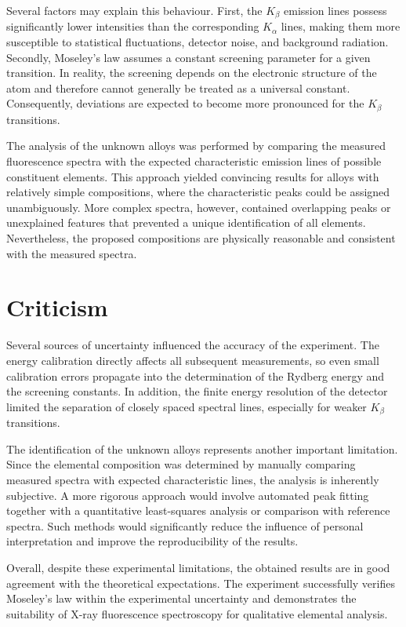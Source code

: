 Several factors may explain this behaviour. First, the $K_\beta$ emission lines possess significantly lower intensities than the corresponding $K_\alpha$ lines, making them more susceptible to statistical fluctuations, detector noise, and background radiation. Secondly, Moseley's law assumes a constant screening parameter for a given transition. In reality, the screening depends on the electronic structure of the atom and therefore cannot generally be treated as a universal constant. Consequently, deviations are expected to become more pronounced for the $K_\beta$ transitions.

The analysis of the unknown alloys was performed by comparing the measured fluorescence spectra with the expected characteristic emission lines of possible constituent elements. This approach yielded convincing results for alloys with relatively simple compositions, where the characteristic peaks could be assigned unambiguously. More complex spectra, however, contained overlapping peaks or unexplained features that prevented a unique identification of all elements. Nevertheless, the proposed compositions are physically reasonable and consistent with the measured spectra.

\section{Criticism}
\label{sec:Kritik}

Several sources of uncertainty influenced the accuracy of the experiment. The energy calibration directly affects all subsequent measurements, so even small calibration errors propagate into the determination of the Rydberg energy and the screening constants. In addition, the finite energy resolution of the detector limited the separation of closely spaced spectral lines, especially for weaker $K_\beta$ transitions.

The identification of the unknown alloys represents another important limitation. Since the elemental composition was determined by manually comparing measured spectra with expected characteristic lines, the analysis is inherently subjective. A more rigorous approach would involve automated peak fitting together with a quantitative least-squares analysis or comparison with reference spectra. Such methods would significantly reduce the influence of personal interpretation and improve the reproducibility of the results.

Overall, despite these experimental limitations, the obtained results are in good agreement with the theoretical expectations. The experiment successfully verifies Moseley's law within the experimental uncertainty and demonstrates the suitability of X-ray fluorescence spectroscopy for qualitative elemental analysis.